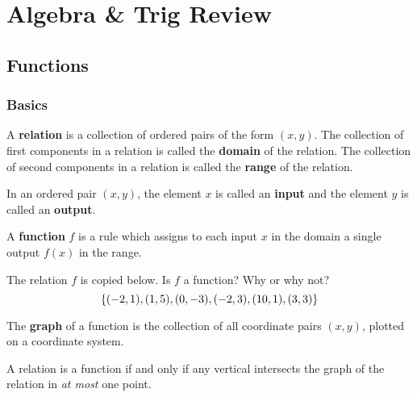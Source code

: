 \documentclass[notes]{subfiles}
\begin{document}
	\chapter{Algebra \& Trig Review}
	\setcounter{section}{1}
	\fancyhead[LO,RE]{\bfseries \currentname}
	\fancyfoot[C]{{}}
	\fancyfoot[LO,RE]{\large \thepage}	%

\section*{Functions}\label{cs11}
	
	\subsection*{Basics}
		\begin{defn}
			A \textbf{relation} is a collection of ordered pairs of the form \((x,y)\). The collection of first components in a relation is called the \textbf{domain} of the relation. The collection of second components in a relation is called the \textbf{range} of the relation.
		\end{defn}
		
		\begin{defn}
			In an ordered pair \((x,y)\), the element \(x\) is called an \textbf{input} and the element \(y\) is called an \textbf{output}. 
		\end{defn}
		
		\begin{defn}[Function]
			A \textbf{function} \(f\) is a rule which assigns to each input \(x\) in the domain a single output \(f(x)\) in the range.
		\end{defn}
		
		\begin{ex}
			The relation \(f\) is copied below. Is \(f\) a function? Why or why not?
			\[\left\lbrace (-2,1), (1,5), (0,-3), (-2,3), (10,1), (3,3) \right\rbrace\]
		\end{ex}
			\newpage
			
		\begin{defn}[Graph]
			The \textbf{graph} of a function is the collection of all coordinate pairs \((x,y)\), plotted on a coordinate system.
		\end{defn}
		
		\begin{thm}
			A relation is a function if and only if any vertical intersects the graph of the relation in \emph{at most} one point.
		\end{thm}
	
\end{document}
